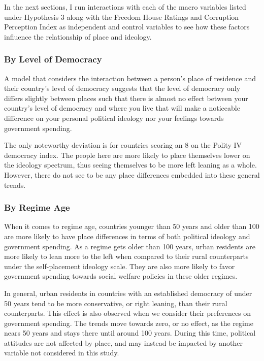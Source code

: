 \documentclass[12pt, titlepage]{article}
\begin{document}
In the next sections, I run interactions with each of the macro variables listed under Hypothesis 3 along with the  Freedom House Ratings and Corruption Perception Index as independent and control variables to see how these factors influence the relationship of place and ideology.

\subsubsection{By Level of Democracy}

A model that considers the interaction between a person's place of residence and their country's level of democracy suggests that the level of democracy only differs slightly between places such that there is almost no effect between your country's level of democracy and where you live that will make a noticeable difference on your personal political ideology nor your feelings towards government spending.

The only noteworthy deviation is for countries scoring an 8 on the Polity IV democracy index. The people here are more likely to place themselves lower on the ideology spectrum, thus seeing themselves to be more left leaning as a whole. However, there do not see to be any place differences embedded into these general trends. 

\subsubsection{By Regime Age}

When it comes to regime age, countries younger than 50 years and older than 100 are more likely to have place differences in terms of both political ideology and government spending. As a regime gets older than 100 years, urban residents are more likely to lean more to the left when compared to their rural counterparts under the self-placement ideology scale. They are also more likely to favor government spending towards social welfare policies in these older regimes. 

In general, urban residents in countries with an established democracy of under 50 years tend to be more conservative, or right leaning, than their rural counterparts. This effect is also observed when we consider their preferences on government spending. The trends move towards zero, or no effect, as the regime nears 50 years and stays there until around 100 years. During this time, political attitudes are not affected by place, and may instead be impacted by another variable not considered in this study.
\end{document}
